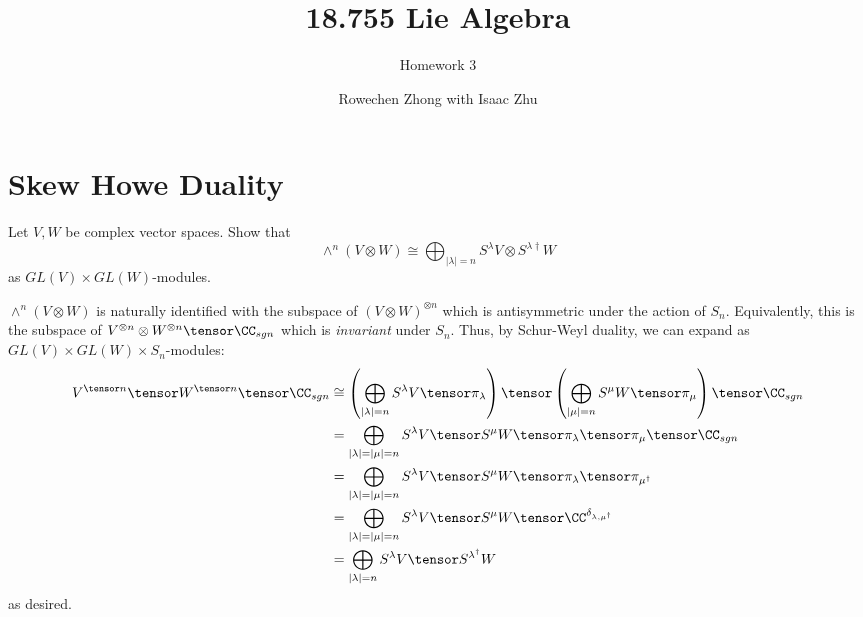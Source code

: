 \documentclass[11pt, headheight=30pt]{scrartcl}
\title{18.755 Lie Algebra}
\subtitle{Homework 3}
\author{Rowechen Zhong with Isaac Zhu}
\begin{document}


\section{Skew Howe Duality}

\begin{prob*}
  Let $V, W$ be complex vector spaces. Show that
  \[
    \wedge^n (V \otimes W) \cong \bigoplus_{|\lambda| = n} S^\lambda V \otimes S^{\lambda \dagger} W
  \]
  as $GL(V) \times GL(W)$-modules.
\end{prob*}

$\wedge^n (V \otimes W)$ is naturally identified with the subspace of $(V \otimes W)^{\otimes n}$ which is antisymmetric under the action of $S_n$. Equivalently, this is the subspace of $V^{\otimes n} \otimes W^{\otimes n} \tensor \CC_{sgn}$ which is \emph{invariant} under $S_n$. Thus, by Schur-Weyl duality, we can expand as $GL(V) \times GL(W) \times S_n$-modules:
\begin{align*}
    V^{\tensor n} \tensor W^{\tensor n} \tensor \CC_{sgn} &\cong \left(
        \bigoplus_{|\lambda|=n} S^\lambda V \tensor \pi_\lambda
    \right)
    \tensor 
    \left(
        \bigoplus_{|\mu|=n} S^\mu W \tensor \pi_\mu
    \right) \tensor \CC_{sgn} \\
    &= \bigoplus_{|\lambda| = |\mu| = n} S^\lambda V \tensor S^\mu W \tensor \pi_\lambda \tensor \pi_\mu \tensor \CC_{sgn} \\
    &= \bigoplus_{|\lambda| = |\mu| = n} S^\lambda V \tensor S^\mu W \tensor \pi_\lambda \tensor \pi_{\mu^\dagger}\\
    &= \bigoplus_{|\lambda| = |\mu| = n} S^\lambda V \tensor S^\mu W \tensor \CC^{\delta_{\lambda, \mu^\dagger}}\\
    &= \bigoplus_{|\lambda| = n} S^\lambda V \tensor S^{\lambda^\dagger} W
\end{align*}
as desired.


\end{document}
